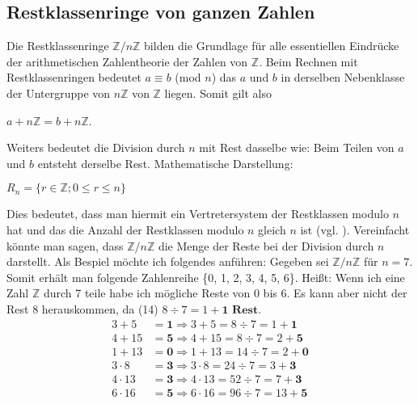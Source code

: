 \documentclass[12pt,a4paper]{article}
\theoremstyle{definition}
\begin{document}
\newpage
\subsection{Restklassenringe von ganzen Zahlen}\label{Restklassenringe von ganzen Zahlen}
Die Restklassenringe $\mathbb{Z}/n\mathbb{Z}$ bilden die Grundlage für alle essentiellen Eindrücke der arithmetischen Zahlentheorie der Zahlen von $\mathbb{Z}$.
Beim Rechnen mit Restklassenringen bedeutet $a \equiv b$ (mod $n$) das $a$ und $b$ in derselben Nebenklasse der Untergruppe von $n\mathbb{Z}$ von $\mathbb{Z}$ liegen.
Somit gilt also
\begin{center}
$a + n\mathbb{Z} = b + n\mathbb{Z}$.
\end{center}
Weiters bedeutet die Division durch $n$ mit Rest dasselbe wie: Beim Teilen von $a$ und $b$ entsteht derselbe Rest.
Mathematische Darstellung:
\begin{center}
$R_n = \{r \in \mathbb{Z}; 0 \leq r \le n\}$
\end{center}
Dies bedeutet, dass man hiermit ein Vertretersystem der Restklassen modulo $n$ hat und das die Anzahl der Restklassen modulo $n$ gleich $n$ ist (vgl. \cite[37--38]{Leutbecher2013}).
Vereinfacht könnte man sagen, dass $\mathbb{Z}/n\mathbb{Z}$ die Menge der Reste bei der Division durch $n$ darstellt.\newline
Als Bespiel möchte ich folgendes anführen:\newline
Gegeben sei $\mathbb{Z}/n \mathbb{Z}$ für $n = 7$.\newline
Somit erhält man folgende Zahlenreihe \{0, 1, 2, 3, 4, 5, 6\}.\newline
Heißt: Wenn ich eine Zahl $\mathbb{Z}$ durch 7 teile habe ich mögliche Reste von 0 bis 6.
Es kann aber nicht der Rest 8 herauskommen, da (14) $8 \div 7 = 1 + \textbf{1 Rest}$.
\begin{align}
3 + 5      &= \textbf{1} \Rightarrow 3 + 5 = 8  \div 7 = 1 + \textbf{1} \\
4 + 15     &= \textbf{5} \Rightarrow 4 + 15 = 8  \div 7 = 2 + \textbf{5} \\
1 + 13     &= \textbf{0} \Rightarrow 1 + 13 = 14  \div 7 = 2 + \textbf{0} \\
3 \cdot 8  &= \textbf{3} \Rightarrow 3 \cdot 8 = 24 \div 7 = 3 + \textbf{3}\\
4 \cdot 13 &= \textbf{3} \Rightarrow 4 \cdot 13 = 52 \div 7 = 7 + \textbf{3}\\
6 \cdot 16 &= \textbf{5} \Rightarrow 6 \cdot 16 = 96 \div 7 = 13 + \textbf{5}
\end{align}
\end{document}
